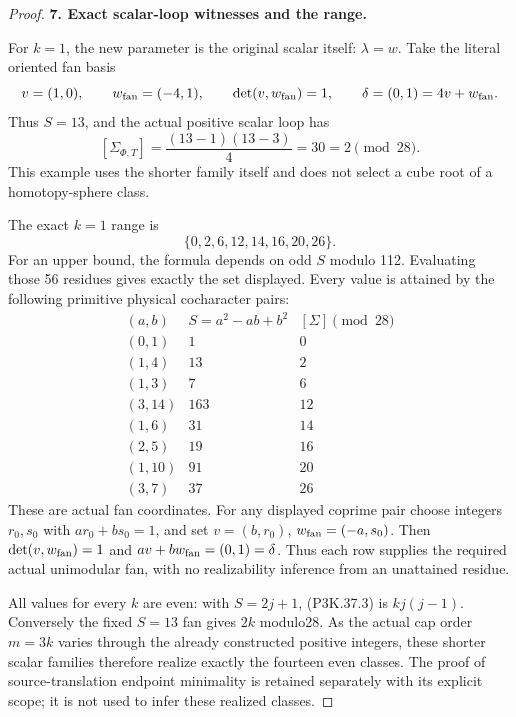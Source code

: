 \begin{proof}
\par\medskip\noindent\textbf{7. Exact scalar-loop witnesses and the range.}\enspace

For \(k=1\), the new parameter is the original scalar itself:
\(\lambda=w\). Take the literal oriented fan basis
\[
 v=(1,0),\qquad w_{\rm fan}=(-4,1),\qquad
 \det(v,w_{\rm fan})=1,\qquad \delta=(0,1)=4v+w_{\rm fan}.
\]
Thus \(S=13\), and the actual positive scalar loop has
\[
 [\Sigma_{\Phi,T}]=\frac{(13-1)(13-3)}4=30=2\pmod {28}.
\]
This example uses the shorter family itself and does not select a cube root
of a homotopy-sphere class.

The exact \(k=1\) range is
\[
                  \{0,2,6,12,14,16,20,26\}.                    \tag{P3K.37.15}
\]
For an upper bound, the formula depends on odd \(S\) modulo 112. Evaluating
those 56 residues gives exactly the set displayed. Every value is attained
by the following primitive physical cocharacter pairs:
\[
\begin{array}{c|r|r}
 (a,b)&S=a^2-ab+b^2&[\Sigma]\pmod {28}\\ \hline
 (0,1)&1&0\\
 (1,4)&13&2\\
 (1,3)&7&6\\
 (3,14)&163&12\\
 (1,6)&31&14\\
 (2,5)&19&16\\
 (1,10)&91&20\\
 (3,7)&37&26
\end{array}
\]
These are actual fan coordinates. For any displayed coprime pair choose
integers \(r_0,s_0\) with \(ar_0+bs_0=1\), and set
\(v=(b,r_0)\), \(w_{\rm fan}=(-a,s_0)\). Then
\(\det(v,w_{\rm fan})=1\) and \(av+bw_{\rm fan}=(0,1)=\delta\).
Thus each row supplies the required actual unimodular fan, with no
realizability inference from an unattained residue.

All values for every \(k\) are even: with \(S=2j+1\), (P3K.37.3) is
\(kj(j-1)\). Conversely the fixed \(S=13\) fan gives \(2k\) modulo28.
As the actual cap order \(m=3k\) varies through the already constructed
positive integers, these shorter scalar families therefore realize exactly
the fourteen even classes. The proof of source-translation endpoint
minimality is retained separately with its explicit scope; it is not used
to infer these realized classes.
\end{proof}
